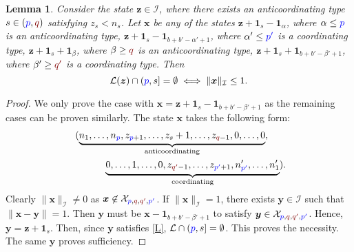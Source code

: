 \documentclass[10 pt,twocolumn,journal]{IEEEtran}
\theoremstyle{plain}
\newtheorem{lemma}{Lemma}
\newcommand{\I}{\mathcal{I}}
\newcommand{\X}{\mathcal{X}}
\renewcommand{\L}{\mathcal{L}}
\newcommand{\x}{\bm{x}}
\newcommand{\y}{\bm{y}}
\newcommand{\z}{\bm{z}}
\newcommand{\p}{\tb{p}}
\newcommand{\pp}{\tb{p'}}
\newcommand{\q}{\tr{q}}
\newcommand{\qq}{\tr{q'}}
\newcommand{\tb}{\textcolor{blue}}
\newcommand{\tr}{\textcolor{Myred}}
\theoremstyle{definition}
\begin{document}
\begin{lemma}   \label{lem_stability3}
    Consider the state $\z\in\I$, where there exists an anticoordinating type $s\in(\p,\q)$ satisfying $z_s < n_s$.
    Let $\x$ be any of the states 
    $\z + \bm{1}_s - \bm{1}_{\alpha}$, where $\alpha\leq\p$ is an anticoordinating type, 
    $\z + \bm{1}_s - \bm{1}_{b+b'-\alpha'+1}$, where $\alpha'\leq\pp$ is a coordinating type, 
    $\z + \bm{1}_s + \bm{1}_{\beta}$, where $\beta\geq\q$ is an anticoordinating type, 
    $\z + \bm{1}_s + \bm{1}_{b+b'-\beta'+1}$, where $\beta'\geq\qq$ is a coordinating type.
    Then 
    $$
    \L(\z)\cap(\p,s] =\emptyset \iff \|\x\|_{\I} \leq 1.
    $$
\end{lemma}
\begin{proof}
    We only prove the case with $\x=\z + \bm{1}_s - \bm{1}_{b+b'-\beta'+1}$ as the remaining cases can be proven similarly.
    The state $\x$ takes the following form:
    \begin{align*}
        \ &(\underbrace{n_1,\ldots,n_{\p}, z_{\p+1},\ldots, z_s+1,\ldots,z_{\q-1}, 0,\ldots, 0}_{\text{anticoordinating}}, \\
        &\qquad\quad\underbrace{0,\ldots,1,\ldots,0, z_{\qq-1},\ldots, z_{\pp+1}, n'_{\pp},\ldots,n'_1}_{\text{coordinating}}).
    \end{align*}
    Clearly $\|\x\|_{\I}\neq 0$ as $\x\not\in\X_{\p,\q,\qq,\pp}$. 
    If $\|\x\|_{\I} = 1$, there exists $\y\in\I$ such that $\|\x-\y\|= 1$. 
    Then $\y$ must be $\x-\bm{1}_{b+b'-\beta'+1}$ to satisfy $\y\in\X_{\p,\q,\qq,\pp}$.
    Hence, $\y=\z+\bm{1}_s$.
    Then, since $\y$ satisfies \eqref{L}, $\L\cap(\p,s]=\emptyset$.
    This proves the necessity. 
    The same $\y$ proves sufficiency. 
\end{proof}
\end{document}
